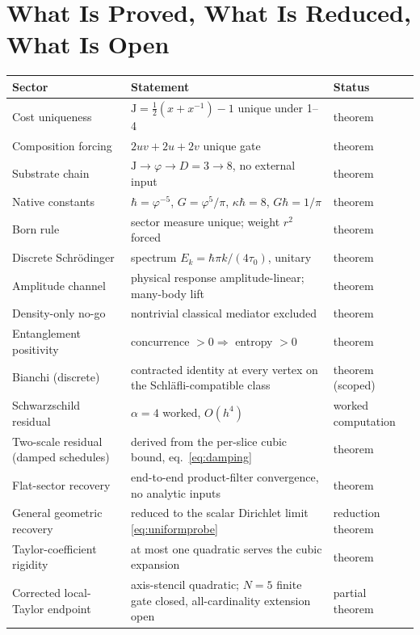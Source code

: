 \documentclass[11pt,letterpaper]{article}
\theoremstyle{definition}
\newcommand{\J}{\mathrm{J}}
\newcommand{\phiG}{\varphi}
\newcommand{\half}{\tfrac{1}{2}}
\begin{document}
\section{What Is Proved, What Is Reduced, What Is Open}
\label{sec:status}

\begin{center}
\footnotesize
\renewcommand{\arraystretch}{1.15}
\begin{tabular}{p{4.6cm}p{6.2cm}l}
\toprule
\textbf{Sector} & \textbf{Statement} & \textbf{Status} \\
\midrule
Cost uniqueness & $\J=\half(x+x^{-1})-1$ unique under 1--4 & theorem \\
Composition forcing & $2uv+2u+2v$ unique gate & theorem \\
Substrate chain & $\J\to\phiG\to D{=}3\to 8$, no external input
& theorem \\
Native constants & $\hbar=\phiG^{-5}$, $G=\phiG^5/\pi$,
$\kappa\hbar=8$, $G\hbar=1/\pi$ & theorem \\
Born rule & sector measure unique; weight $r^2$ forced & theorem \\
Discrete Schr\"odinger & spectrum $E_k=\hbar\pi k/(4\tau_0)$, unitary
& theorem \\
Amplitude channel & physical response amplitude-linear; many-body lift
& theorem \\
Density-only no-go & nontrivial classical mediator excluded & theorem \\
Entanglement positivity & concurrence $>0\Rightarrow$ entropy $>0$
& theorem \\
Bianchi (discrete) & contracted identity at every vertex on the
Schl\"afli-compatible class & theorem (scoped) \\
Schwarzschild residual & $\alpha=4$ worked, $O(h^4)$
& worked computation \\
Two-scale residual (damped schedules) & derived from the per-slice
cubic bound, eq.~\eqref{eq:damping} & theorem \\
Flat-sector recovery & end-to-end product-filter convergence, no
analytic inputs & theorem \\
General geometric recovery & reduced to the scalar Dirichlet limit
\eqref{eq:uniformprobe} & reduction theorem \\
Taylor-coefficient rigidity & at most one quadratic serves the cubic
expansion & theorem \\
Corrected local-Taylor endpoint & axis-stencil quadratic; $N=5$
finite gate closed, all-cardinality extension open & partial theorem \\

\end{tabular}
\end{center}
\end{document}
